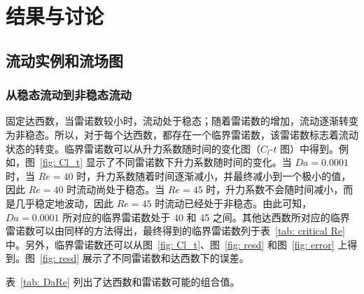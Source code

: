 \chapter{结果与讨论}

\section{流动实例和流场图}

\subsection{从稳态流动到非稳态流动}

固定达西数，当雷诺数较小时，流动处于稳态；随着雷诺数的增加，流动逐渐转变为非稳态。所以，对于每个达西数，都存在一个临界雷诺数，该雷诺数标志着流动状态的转变。临界雷诺数可以从升力系数随时间的变化图（$C_l$-$t$ 图）中得到。例如，图~\ref{fig: Cl_t} 显示了不同雷诺数下升力系数随时间的变化。当 $Da=0.0001$ 时，当 $Re=40$ 时，升力系数随着时间逐渐减小，并最终减小到一个极小的值，因此 $Re=40$ 时流动尚处于稳态。当 $Re=45$ 时，升力系数不会随时间减小，而是几乎稳定地波动，因此 $Re=45$ 时流动已经处于非稳态。由此可知，$Da=0.0001$ 所对应的临界雷诺数处于 40 和 45 之间。其他达西数所对应的临界雷诺数可以由同样的方法得出，最终得到的临界雷诺数列于表~\ref{tab: critical Re} 中。另外，临界雷诺数还可以从图~\ref{fig: Cl_t}、图~\ref{fig: resd} 和图~\ref{fig: error} 上得到。图~\ref{fig: resd} 展示了不同雷诺数和达西数下的误差。

表~\ref{tab: DaRe} 列出了达西数和雷诺数可能的组合值。

